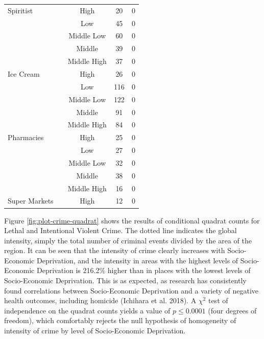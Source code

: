 \documentclass[smallextended]{svjour3}       %
\begin{document}
\begin{table}
\begin{tabular}[t]{lcccl}
\multirow{-5}{*}{\raggedright\arraybackslash Spiritist} &  & High & 20 & 0\\

 &  & Low & 45 & 0\\

 &  & Middle Low & 60 & 0\\

 &  & Middle & 39 & 0\\

 &  & Middle High & 37 & 0\\

\multirow{-5}{*}{\raggedright\arraybackslash Ice Cream} &  & High & 26 & 0\\

 &  & Low & 116 & 0\\

 &  & Middle Low & 122 & 0\\

 &  & Middle & 91 & 0\\

 &  & Middle High & 84 & 0\\

\multirow{-5}{*}{\raggedright\arraybackslash Pharmacies} &  & High & 25 & 0\\

 &  & Low & 27 & 0\\

 &  & Middle Low & 32 & 0\\

 &  & Middle & 38 & 0\\

 &  & Middle High & 16 & 0\\

\multirow{-5}{*}{\raggedright\arraybackslash Super Markets} & \multirow{-35}{*}{\centering\arraybackslash 0} & High & 12 & 0\\
\bottomrule
\end{tabular}
\end{table}

Figure \ref{fig:plot-crime-quadrat} shows the results of conditional
quadrat counts for Lethal and Intentional Violent Crime. The dotted line
indicates the global intensity, simply the total number of criminal
events divided by the area of the region. It can be seen that the
intensity of crime clearly increases with Socio-Economic Deprivation,
and the intensity in areas with the highest levels of Socio-Economic
Deprivation is 216.2\% higher than in places with the lowest levels of
Socio-Economic Deprivation. This is as expected, as research has
consistently found correlations between Socio-Economic Deprivation and a
variety of negative health outcomes, including homicide (Ichihara et al.
2018). A \(\chi^2\) test of independence on the quadrat counts yields a
value of \(p\leq 0.0001\) (four degrees of freedom), which comfortably
rejects the null hypothesis of homogeneity of intensity of crime by
level of Socio-Economic Deprivation.
\end{document}
